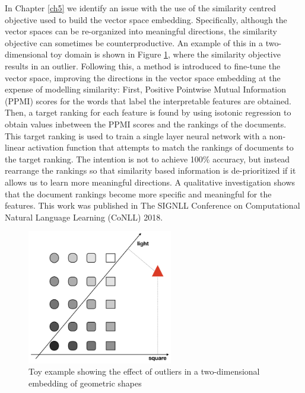 In Chapter \ref{ch5} we identify an issue with the use of the similarity centred objective used to build the vector space embedding. Specifically, although the vector spaces can be re-organized into meaningful directions, the similarity objective can sometimes be counterproductive. An example of this in a two-dimensional toy domain is shown in Figure \ref{ch1:toyExample}, where the similarity objective results in an outlier. Following this, a method is introduced to fine-tune the vector space, improving the directions in the vector space embedding at the expense of modelling similarity: First, Positive Pointwise Mutual Information (PPMI) scores for the words that label the interpretable features are obtained. Then, a target ranking for each feature is found by using isotonic regression to obtain values inbetween the PPMI scores and the rankings of the documents. This target ranking is used to train a single layer neural network with a non-linear activation function that attempts to match the rankings of documents to the target ranking. The intention is not to achieve 100\% accuracy, but instead rearrange the rankings so that similarity based information is de-prioritized if it allows us to learn more meaningful directions.  A qualitative investigation shows that the document rankings become more specific and meaningful for the features. This work was published in The SIGNLL Conference on Computational Natural Language Learning (CoNLL) 2018.

\begin{figure}
	\centering
	\includegraphics[width=180pt]{images/shapes}
	\caption{Toy example showing the effect of outliers in a two-dimensional embedding of geometric shapes}
	\label{ch1:toyExample}
\end{figure}

